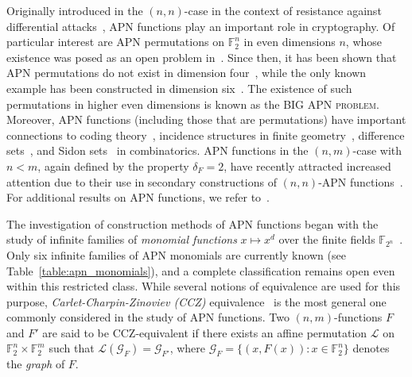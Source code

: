 \documentclass{amsart}[11pt]
\theoremstyle{plain}
\theoremstyle{definition}
\numberwithin{theorem}{section}
\numberwithin{equation}{section}
\numberwithin{table}{section}
\numberwithin{figure}{section}
\numberwithin{algorithm}{section}
\def\F{\mathbb F}
\begin{document}
Originally introduced in the $(n,n)$-case in the context of resistance against differential attacks~\cite{DBLP:conf/crypto/NybergK92}, APN functions play an important role in cryptography. Of particular interest are APN permutations on $\F_2^n$ in even dimensions $n$, whose existence was posed as an open problem in~\cite{Dobbertin1999:Niho}. Since then, it has been shown that APN permutations do not exist in dimension four~\cite{Hou06}, while the only known example has been constructed in dimension six~\cite{Dillon-perm}. The existence of such permutations in higher even dimensions is known as the \textsc{BIG APN problem}.  Moreover, APN functions (including those that are permutations) have important connections to coding theory~\cite{DBLP:journals/dcc/CarletCZ98}, incidence structures in finite geometry~\cite{Yoshiara10}, difference sets~\cite{Dillon1999,DillonDobbertin2004}, and Sidon sets~\cite{CarletPicek2021,CzerwinskiP26} in combinatorics. APN functions in the $(n,m)$-case with $n<m$, again defined by the property $\delta_F=2$, have recently attracted increased attention due to their use in secondary constructions of $(n,n)$-APN functions~\cite{DBLP:journals/dcc/BeierleLP22,DBLP:journals/corr/abs-2501-03922}. For additional results on APN functions, we refer to~\cite{DBLP:journals/corr/abs-2501-03922,Carlet2021_Book}.


The investigation of construction methods of APN functions began with the study of infinite families of \emph{monomial functions} $x \mapsto x^d$ over the finite fields $\mathbb{F}_{2^n}$~\cite{Gold1968,JanwaWilson1993}. Only six infinite families of APN monomials are currently known (see Table~\ref{table:apn_monomials}), and a complete classification remains open even within this restricted class. While several notions of equivalence are used for this purpose, \emph{Carlet-Charpin-Zinoviev (CCZ)} equivalence~\cite{DBLP:journals/dcc/CarletCZ98} is the most general one commonly considered in the study of APN functions. Two $(n,m)$-functions $F$ and $F'$ are said to be CCZ-equivalent if there exists an affine permutation $\mathcal{L}$ on $\F_2^{n} \times \F_2^{m}$ such that $\mathcal{L}\left(\mathcal{G}_{F}\right)=\mathcal{G}_{F'}$, where $\mathcal{G}_{F}=\{(x,F(x))\colon x\in\F_2^n\}$ denotes the \emph{graph} of $F$.
\end{document}
